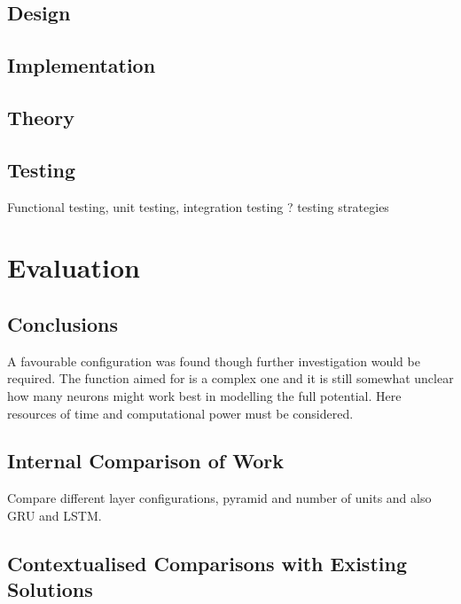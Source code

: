 \documentclass[12pt,]{article}
\begin{document}
\hypertarget{design}{%
\subsection{Design}\label{design}}

\hypertarget{implementation-2}{%
\subsection{Implementation}\label{implementation-2}}

\hypertarget{theory}{%
\subsection{Theory}\label{theory}}

\hypertarget{testing}{%
\subsection{Testing}\label{testing}}

Functional testing, unit testing, integration testing ? testing
strategies

\hypertarget{evaluation}{%
\section{Evaluation}\label{evaluation}}

\hypertarget{conclusions}{%
\subsection{Conclusions}\label{conclusions}}

A favourable configuration was found though further investigation would
be required. The function aimed for is a complex one and it is still
somewhat unclear how many neurons might work best in modelling the full
potential. Here resources of time and computational power must be
considered.

\hypertarget{internal-comparison-of-work}{%
\subsection{Internal Comparison of
Work}\label{internal-comparison-of-work}}

Compare different layer configurations, pyramid and number of units and
also GRU and LSTM.

\hypertarget{contextualised-comparisons-with-existing-solutions}{%
\subsection{Contextualised Comparisons with Existing
Solutions}\label{contextualised-comparisons-with-existing-solutions}}
\end{document}
